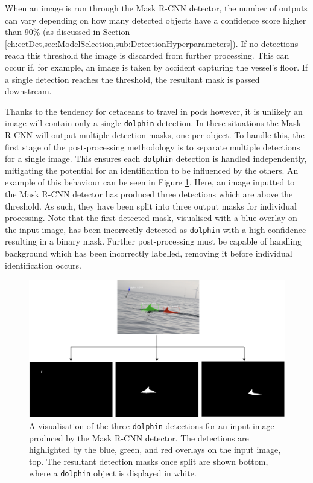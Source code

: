 When an image is run through the Mask R-CNN detector, the number of outputs can vary depending on how many detected objects have a confidence score higher than 90\% (as discussed in Section \ref{ch:cetDet,sec:ModelSelection,sub:DetectionHyperparameters}). If no detections reach this threshold the image is discarded from further processing. This can occur if, for example, an image is taken by accident capturing the vessel's floor. If a single detection reaches the threshold, the resultant mask is passed downstream. 

Thanks to the tendency for cetaceans to travel in pods however, it is unlikely an image will contain only a single \texttt{dolphin} detection. In these situations the Mask R-CNN will output multiple detection masks, one per object. To handle this, the first stage of the post-processing methodology is to separate multiple detections for a single image. This ensures each \texttt{dolphin} detection is handled independently, mitigating the potential for an identification to be influenced by the others. An example of this behaviour can be seen in Figure \ref{fig:190730-001-MOLS0360_-detections}. Here, an image inputted to the Mask R-CNN detector has produced three detections which are above the threshold. As such, they have been split into three output masks for individual processing. Note that the first detected mask, visualised with a blue overlay on the input image, has been incorrectly detected as \texttt{dolphin} with a high confidence resulting in a binary mask. Further post-processing must be capable of handling background which has been incorrectly labelled, removing it before individual identification occurs.

\begin{figure}
	\begin{center}
		\includegraphics[scale=0.45]{Chapter3/figs/190730-001-MOLS0360_-detections.png}
	\end{center}
	\caption[A visualisation of the three \texttt{dolphin} detections for an input image produced by the Mask R-CNN detector.]{A visualisation of the three \texttt{dolphin} detections for an input image produced by the Mask R-CNN detector. The detections are highlighted by the blue, green, and red overlays on the input image, top. The resultant detection masks once split are shown bottom, where a \texttt{dolphin} object is displayed in white.}
	\label{fig:190730-001-MOLS0360_-detections}
\end{figure}


